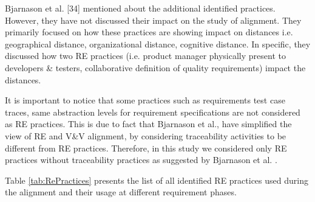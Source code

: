 \documentclass{article}
\begin{document}
 Bjarnason et al. [34] mentioned about the additional identified practices. However, they have not discussed their impact on the study of alignment. They primarily focused on how these practices are showing impact on distances i.e. geographical distance, organizational distance, cognitive distance. In specific, they discussed how two RE practices (i.e. product manager physically present to developers \& testers, collaborative definition of quality requirements) impact the distances.

It is important to notice that some practices such as requirements test case traces, same abstraction levels for requirement specifications are not considered as RE practices. This is due to fact that Bjarnason et al.\cite{bjarnason2014challenges}, have simplified the view of RE and V\&V alignment, by considering traceability activities to be different from RE practices. Therefore, in this study we considered only RE practices without traceability practices as suggested by Bjarnason et al. \cite{bjarnason2014challenges}. 



Table  \ref{tab:RePractices} presents the list of all identified RE practices used during the alignment and their usage at different requirement phases.
\end{document}
